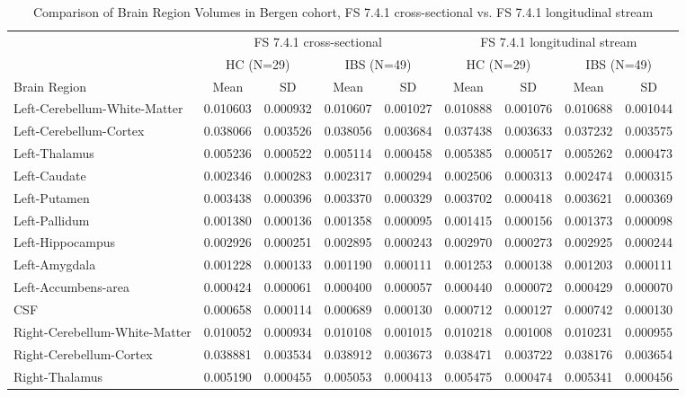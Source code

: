 \begin{table}[H]
\setlength{\tabcolsep}{5pt}
\scriptsize
\centering
\caption{Comparison of Brain Region Volumes in Bergen cohort, FS 7.4.1 cross-sectional vs. FS 7.4.1 longitudinal stream}
\begin{tabular}{l|cc|cc|cc|cc}
\hline
 & \multicolumn{4}{c|}{FS 7.4.1 cross-sectional} & \multicolumn{4}{c}{FS 7.4.1 longitudinal stream} \\
 & \multicolumn{2}{c|}{HC (N=29)} & \multicolumn{2}{c|}{IBS (N=49)} & \multicolumn{2}{c|}{HC (N=29)} & \multicolumn{2}{c}{IBS (N=49)} \\
Brain Region & Mean & SD & Mean & SD & Mean & SD & Mean & SD \\
\hline
Left-Cerebellum-White-Matter & 0.010603 & 0.000932 & 0.010607 & 0.001027 & 0.010888 & 0.001076 & 0.010688 & 0.001044 \\
Left-Cerebellum-Cortex & 0.038066 & 0.003526 & 0.038056 & 0.003684 & 0.037438 & 0.003633 & 0.037232 & 0.003575 \\
Left-Thalamus & 0.005236 & 0.000522 & 0.005114 & 0.000458 & 0.005385 & 0.000517 & 0.005262 & 0.000473 \\
Left-Caudate & 0.002346 & 0.000283 & 0.002317 & 0.000294 & 0.002506 & 0.000313 & 0.002474 & 0.000315 \\
Left-Putamen & 0.003438 & 0.000396 & 0.003370 & 0.000329 & 0.003702 & 0.000418 & 0.003621 & 0.000369 \\
Left-Pallidum & 0.001380 & 0.000136 & 0.001358 & 0.000095 & 0.001415 & 0.000156 & 0.001373 & 0.000098 \\
Left-Hippocampus & 0.002926 & 0.000251 & 0.002895 & 0.000243 & 0.002970 & 0.000273 & 0.002925 & 0.000244 \\
Left-Amygdala & 0.001228 & 0.000133 & 0.001190 & 0.000111 & 0.001253 & 0.000138 & 0.001203 & 0.000111 \\
Left-Accumbens-area & 0.000424 & 0.000061 & 0.000400 & 0.000057 & 0.000440 & 0.000072 & 0.000429 & 0.000070 \\
CSF & 0.000658 & 0.000114 & 0.000689 & 0.000130 & 0.000712 & 0.000127 & 0.000742 & 0.000130 \\
Right-Cerebellum-White-Matter & 0.010052 & 0.000934 & 0.010108 & 0.001015 & 0.010218 & 0.001008 & 0.010231 & 0.000955 \\
Right-Cerebellum-Cortex & 0.038881 & 0.003534 & 0.038912 & 0.003673 & 0.038471 & 0.003722 & 0.038176 & 0.003654 \\
Right-Thalamus & 0.005190 & 0.000455 & 0.005053 & 0.000413 & 0.005475 & 0.000474 & 0.005341 & 0.000456 \\

\end{tabular}
\end{table}
